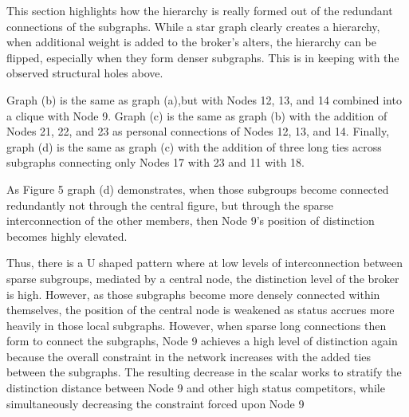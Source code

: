 \documentclass[12pt]{article}
\begin{document}
This section highlights how the hierarchy is really formed out of the redundant connections of the subgraphs. While a star graph clearly creates a hierarchy, when additional weight is added to the broker's alters, the hierarchy can be flipped, especially when they form denser subgraphs. This is in keeping with the observed structural holes above. 

Graph (b) is the same as graph (a),but with Nodes 12, 13, and 14 combined into a clique with Node 9. Graph (c) is the same as graph (b) with the addition of Nodes 21, 22, and 23 as personal connections of Nodes 12, 13, and 14. Finally, graph (d) is the same as graph (c) with the addition of three long ties across subgraphs connecting only Nodes 17 with 23 and 11 with 18.

As Figure 5 graph (d) demonstrates, when those subgroups become connected redundantly not through the central figure, but through the sparse interconnection of the other members, then Node 9's position of distinction becomes highly elevated.

Thus, there is a U shaped pattern where at low levels of interconnection between sparse subgroups, mediated by a central node, the distinction level of the broker is high. However, as those subgraphs become more densely connected within themselves, the position of the central node is weakened as status accrues more heavily in those local subgraphs. However, when sparse long connections then form to connect the subgraphs, Node 9 achieves a high level of distinction again because the overall constraint in the network increases with the added ties between the subgraphs. The resulting decrease in the scalar works to stratify the distinction distance between Node 9 and other high status competitors, while simultaneously decreasing the constraint forced upon Node 9 
\end{document}
